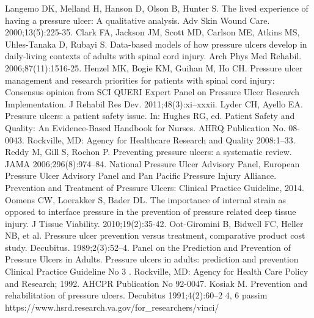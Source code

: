 \documentclass{amia}
\begin{document}
{\footnotesize

\begin{thebibliography}{1}
\setlength\itemsep{-0.1em}

Langemo DK, Melland H, Hanson D, Olson B, Hunter S. The lived experience of having a pressure ulcer: A qualitative analysis. Adv Skin Wound Care. 2000;13(5):225-35.
Clark FA, Jackson JM, Scott MD, Carlson ME, Atkins MS, Uhles-Tanaka D, Rubayi S. Data-based models of how pressure ulcers develop in daily-living contexts of adults with spinal cord injury. Arch Phys Med Rehabil. 2006;87(11):1516-25.
Henzel MK, Bogie KM, Guihan M, Ho CH. Pressure ulcer management and research priorities for patients with spinal cord injury: Consensus opinion from SCI QUERI Expert Panel on Pressure Ulcer Research Implementation. J Rehabil Res Dev. 2011;48(3):xi–xxxii.
Lyder CH, Ayello EA. Pressure ulcers: a patient safety issue. In: Hughes RG, ed. Patient Safety and Quality: An Evidence-Based Handbook for Nurses. AHRQ Publication No. 08-0043. Rockville, MD: Agency for Healthcare Research and Quality 2008:1–33.
Reddy M, Gill S, Rochon P. Preventing pressure ulcers: a systematic review. JAMA 2006;296(8):974–84.
National Pressure Ulcer Advisory Panel, European Pressure Ulcer Advisory Panel and Pan Pacific Pressure Injury Alliance. Prevention and Treatment of Pressure Ulcers: Clinical Practice Guideline, 2014.
Oomens CW, Loerakker S, Bader DL. The importance of internal strain as opposed to interface pressure in the prevention of pressure related deep tissue injury. J Tissue Viability. 2010;19(2):35-42.
Oot-Giromini B, Bidwell FC, Heller NB, et al. Pressure ulcer prevention versus treatment, comparative product cost study. Decubitus. 1989;2(3):52–4.
Panel on the Prediction and Prevention of Pressure Ulcers in Adults. Pressure ulcers in adults: prediction and prevention Clinical Practice Guideline No 3 . Rockville, MD: Agency for Health Care Policy and Research; 1992. AHCPR Publication No 92-0047.
Kosiak M. Prevention and rehabilitation of pressure ulcers. Decubitus 1991;4(2):60–2 4, 6 passim
https://www.hsrd.research.va.gov/for\_researchers/vinci/


\end{thebibliography}}
\end{document}
